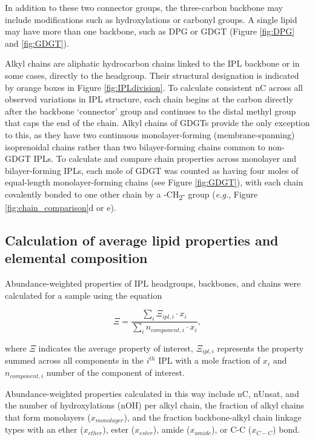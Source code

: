 In addition to these two connector groups, the three-carbon backbone may include modifications such as hydroxylations or carbonyl groups. A single lipid may have more than one backbone, such as DPG or GDGT (Figure \ref{fig:DPG} and \ref{fig:GDGT}). 

Alkyl chains are aliphatic hydrocarbon chains linked to the IPL backbone or in some cases, directly to the headgroup. Their structural designation is indicated by orange boxes in Figure \ref{fig:IPLdivision}. To calculate consistent nC across all observed variations in IPL structure, each chain begins at the carbon directly after the backbone `connector' group and continues to the distal methyl group that caps the end of the chain. Alkyl chains of GDGTs provide the only exception to this, as they have two continuous monolayer-forming (membrane-spanning) isoprenoidal chains rather than two bilayer-forming chains common to non-GDGT IPLs. To calculate and compare chain properties across monolayer and bilayer-forming IPLs, each mole of GDGT was counted as having four moles of equal-length monolayer-forming chains (see Figure \ref{fig:GDGT}), with each chain covalently bonded to one other chain by a -CH\textsubscript{2}- group (\textit{e.g.}, Figure \ref{fig:chain_comparison}d or e).





\subsection{Calculation of average lipid properties and elemental composition}
Abundance-weighted properties of IPL headgroups, backbones, and chains were calculated for a sample using the equation

\begin{equation} \label{eq:avecomponent}
\Xi = \frac{\sum_{i} \Xi_{ipl,i} \cdot x_{i}}{\sum_{i} n_{component,i} \cdot x_{i}},
\end{equation}

\noindent where $\Xi$ indicates the average property of interest, $\Xi_{ipl,i}$ represents the property summed across all components in the $i^{th}$ IPL with a mole fraction of $x_{i}$ and $n_{component,i}$ number of the component of interest.

Abundance-weighted properties calculated in this way include nC, nUnsat, and the number of hydroxylations (nOH) per alkyl chain, the fraction of alkyl chains that form monolayers ($x_{monolayer}$), and the fraction backbone-alkyl chain linkage types with an ether ($x_{ether}$), ester ($x_{ester}$), amide ($x_{amide}$), or C-C ($x_{C-C}$) bond.

